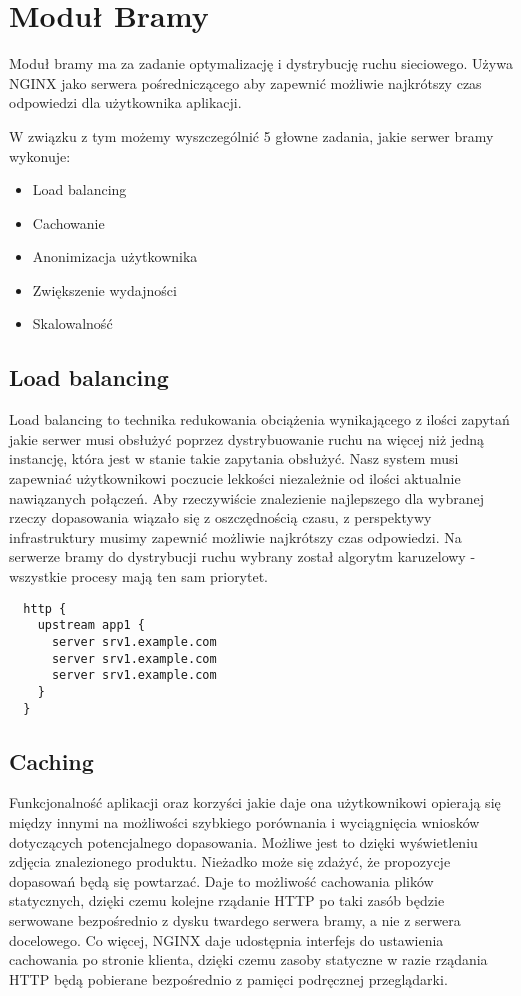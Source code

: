 \chapter {Moduł Bramy}

Moduł bramy ma za zadanie optymalizację i dystrybucję ruchu sieciowego.
Używa NGINX jako serwera pośredniczącego aby zapewnić możliwie najkrótszy czas
odpowiedzi dla użytkownika aplikacji.

W związku z tym możemy wyszczególnić 5 głowne zadania, jakie serwer bramy wykonuje:


\begin{itemize}
  \item Load balancing
  \item Cachowanie
  \item Anonimizacja użytkownika
  \item Zwiększenie wydajności
  \item Skalowalność
\end{itemize}

\section{Load balancing}

Load balancing to technika redukowania obciążenia wynikającego z ilości zapytań jakie serwer musi obsłużyć poprzez dystrybuowanie ruchu na więcej niż jedną instancję, która jest w stanie takie zapytania obsłużyć. Nasz system musi zapewniać użytkownikowi poczucie lekkości niezależnie od ilości aktualnie nawiązanych połączeń. Aby rzeczywiście znalezienie najlepszego dla wybranej rzeczy dopasowania wiązało się z oszczędnością czasu, z perspektywy infrastruktury musimy zapewnić możliwie najkrótszy czas odpowiedzi.
Na serwerze bramy do dystrybucji ruchu wybrany został algorytm karuzelowy - wszystkie procesy mają ten sam priorytet.
\begin{lstlisting}
  http {
    upstream app1 {
      server srv1.example.com
      server srv1.example.com
      server srv1.example.com
    }
  }
\end{lstlisting}

\section{Caching}

Funkcjonalność aplikacji oraz korzyści jakie daje ona użytkownikowi opierają się między innymi na możliwości szybkiego porównania i wyciągnięcia wniosków dotyczących potencjalnego dopasowania. Możliwe jest to dzięki wyświetleniu zdjęcia znalezionego produktu. Nieżadko może się zdażyć, że propozycje dopasowań będą się powtarzać. Daje to możliwość cachowania plików statycznych, dzięki czemu kolejne rządanie HTTP po taki zasób będzie serwowane bezpośrednio z dysku twardego serwera bramy, a nie z serwera docelowego.
Co więcej, NGINX daje udostępnia interfejs do ustawienia cachowania po stronie klienta, dzięki czemu zasoby statyczne w razie rządania HTTP będą pobierane bezpośrednio z pamięci podręcznej przeglądarki.

